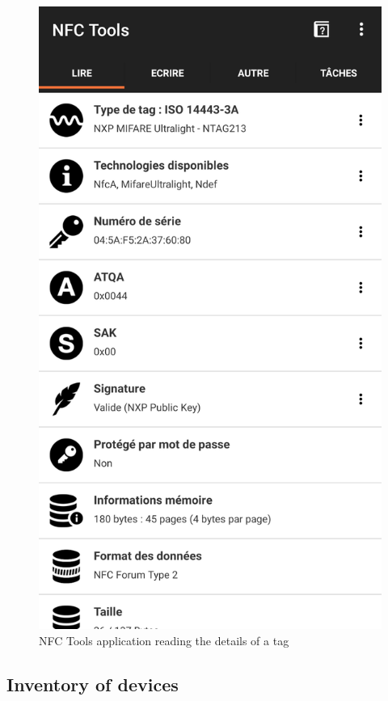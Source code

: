 \begin{figure}[htbp!]
  \centering
  \includegraphics[scale=0.2]{figures/data_NFC-Tools.png}
  \caption{NFC Tools application reading the details of a tag}
  \label{fig:nfc-tools}
\end{figure}

\newpage
\subsection{Inventory of devices}

